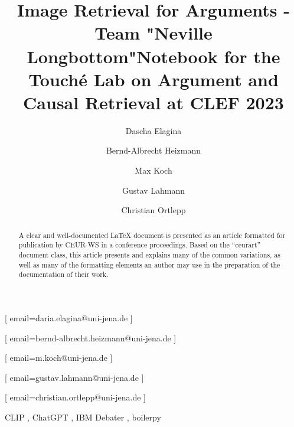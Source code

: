 \documentclass[
]{ceurart}
\begin{document}


\title{Image Retrieval for Arguments - Team "Neville Longbottom"}
\title[mode=sub]{Notebook for the Touch{\'e} Lab on Argument and Causal Retrieval at CLEF 2023}


\author[1]{Dascha Elagina}[%
email=daria.elagina@uni-jena.de
]
\author[1]{Bernd-Albrecht Heizmann}[%
email=bernd-albrecht.heizmann@uni-jena.de
]
\author[1]{Max Koch}[%
email=m.koch@uni-jena.de
]
\author[1]{Gustav Lahmann}[%
email=gustav.lahmann@uni-jena.de
]
\author[1]{Christian Ortlepp}[%
email=christian.ortlepp@uni-jena.de
]


\address[1]{Friedrich-Schiller University Jena,
07743, Jena}


\begin{abstract}
  A clear and well-documented \LaTeX{} document is presented as an
  article formatted for publication by CEUR-WS in a conference
  proceedings. Based on the ``ceurart'' document class, this article
  presents and explains many of the common variations, as well as many
  of the formatting elements an author may use in the preparation of
  the documentation of their work.
\end{abstract}

\begin{keywords}
  CLIP \sep
  ChatGPT \sep
  IBM Debater \sep
	boilerpy
\end{keywords}

\maketitle
\end{document}
